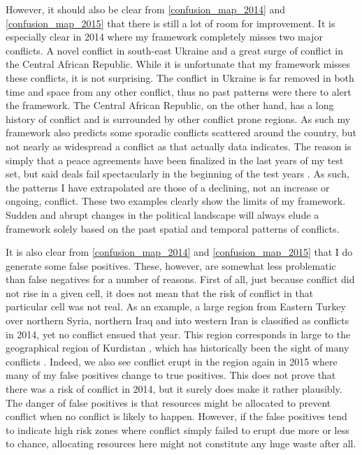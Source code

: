 \documentclass[a4paper]{article}
\begin{document}
However, it should also be clear from \autoref{confusion_map_2014} and \autoref{confusion_map_2015} that there is still a lot of room for improvement. It is especially clear in 2014 where my framework completely misses two major conflicts. A novel conflict in south-east Ukraine and a great surge of conflict in the Central African Republic. While it is unfortunate that my framework misses these conflicts, it is not surprising. The conflict in Ukraine is far removed in both time and space from any other conflict, thus no past patterns were there to alert the framework. The Central African Republic, on the other hand, has a long history of conflict and is surrounded by other conflict prone regions. As such my framework also predicts some sporadic conflicts scattered around the country, but not nearly as widespread a conflict as that actually data indicates. The reason is simply that a peace agreements have been finalized in the last years of my test set, but said deals fail spectacularly in the beginning of the test years \cite{bbc}. As such, the patterns I have extrapolated are those of a declining, not an increase or ongoing, conflict. These two examples clearly show the limits of my framework. Sudden and abrupt changes in the political landscape will always elude a framework solely based on the past spatial and temporal patterns of conflicts.\par

It is also clear from \autoref{confusion_map_2014} and \autoref{confusion_map_2015} that I do generate some false positives. These, however, are somewhat less problematic than false negatives for a number of reasons. First of all, just because conflict did not rise in a given cell, it does not mean that the risk of conflict in that particular cell was not real. As an example, a large region from Eastern Turkey over northern Syria, northern Iraq and into western Iran is classified as conflicts in 2014, yet no conflict ensued that year. This region corresponds in large to the geographical region of Kurdistan \citep[271-272]{DahlmanKurdistan}, which has historically been the sight of many conflicts \citep{DahlmanKurdistan}.  Indeed, we also see conflict erupt in the region again in 2015 where many of my false positives change to true positives. This does not prove that there was a risk of conflict in 2014, but it surely does make it rather plausibly. The danger of false positives is that resources might be allocated to prevent conflict when no conflict is likely to happen. However, if the false positives tend to indicate high risk zones where conflict simply failed to erupt due more or less to chance, allocating resources here might not constitute any huge waste after all.\par
\end{document}
